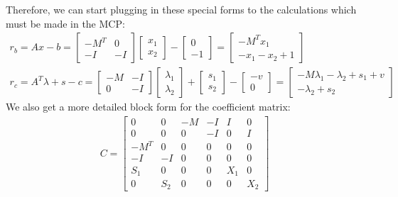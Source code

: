 \documentclass{article}
\begin{document}
Therefore, we can start plugging in these special forms to the calculations which must be made in the MCP:
\begin{align}
		r_b = Ax - b = \begin{bmatrix}
				-M^T & 0\\
				-I & -I
				\end{bmatrix} \begin{bmatrix}
				x_1\\
				x_2\end{bmatrix}
				- \begin{bmatrix}
						0\\
						-1
				\end{bmatrix}
				= \begin{bmatrix}
				-M^Tx_1\\
				 -x_1-x_2+1
				\end{bmatrix}\\
		r_c = A^T\lambda + s - c = \begin{bmatrix}
				-M & -I\\
				0  & -I
				\end{bmatrix} \begin{bmatrix} \lambda_1 \\ \lambda_2\end{bmatrix} + \begin{bmatrix} s_1 \\ s_2 \end{bmatrix} - \begin{bmatrix} -v \\ 0 \end{bmatrix} = 
				\begin{bmatrix}
						-M\lambda_1 - \lambda_2 + s_1 + v\\
						-\lambda_2 + s_2
				\end{bmatrix}
\end{align}
We also get a more detailed block form for the coefficient matrix:
\begin{align}
		C = \begin{bmatrix}
				0    & 0   & -M & -I & I   & 0\\
				0    & 0   &  0 & -I & 0   & I\\
				-M^T & 0   &  0 &  0 & 0   & 0\\
				-I   & -I  &  0 &  0 & 0   & 0\\
				S_1  &  0  &  0 &  0 & X_1 & 0\\
				0    & S_2 &  0 &  0 & 0   & X_2
		\end{bmatrix}
\end{align}
\end{document}

